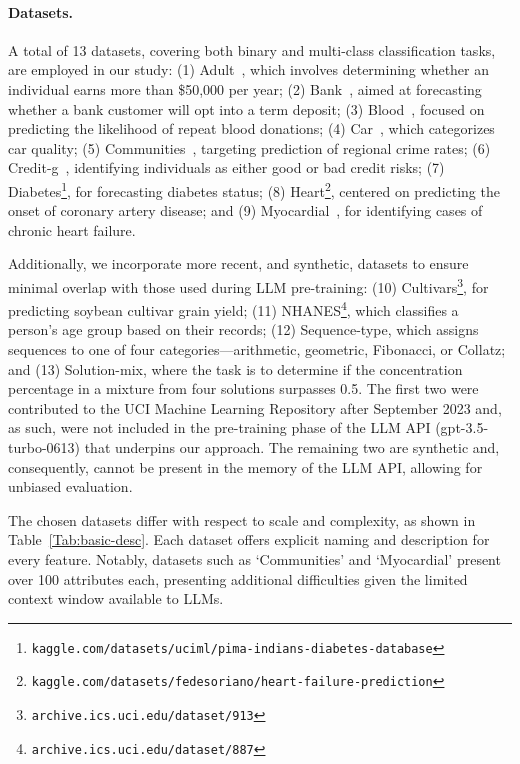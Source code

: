 \paragraph{Datasets.}
A total of 13 datasets, covering both binary and multi-class classification tasks, are employed in our study: (1) Adult~\cite{asuncion2007uci}, which involves determining whether an individual earns more than \$50,000 per year; (2) Bank~\cite{moro2014data}, aimed at forecasting whether a bank customer will opt into a term deposit; (3) Blood~\cite{yeh2009knowledge}, focused on predicting the likelihood of repeat blood donations; (4) Car~\cite{kadra2021well}, which categorizes car quality; (5) Communities~\cite{misc_communities_and_crime_183}, targeting prediction of regional crime rates; (6) Credit-g~\cite{kadra2021well}, identifying individuals as either good or bad credit risks; (7) Diabetes\footnote{\texttt{kaggle.com/datasets/uciml/pima-indians-diabetes-database}}, for forecasting diabetes status; (8) Heart\footnote{\texttt{kaggle.com/datasets/fedesoriano/heart-failure-prediction}}, centered on predicting the onset of coronary artery disease; and (9) Myocardial~\cite{misc_myocardial_infarction_complications_579}, for identifying cases of chronic heart failure.

Additionally, we incorporate more recent, and synthetic, datasets to ensure minimal overlap with those used during LLM pre-training: (10) Cultivars\footnote{\texttt{archive.ics.uci.edu/dataset/913}}, for predicting soybean cultivar grain yield; (11) NHANES\footnote{\texttt{archive.ics.uci.edu/dataset/887}}, which classifies a person’s age group based on their records; (12) Sequence-type, which assigns sequences to one of four categories—arithmetic, geometric, Fibonacci, or Collatz; and (13) Solution-mix, where the task is to determine if the concentration percentage in a mixture from four solutions surpasses 0.5. The first two were contributed to the UCI Machine Learning Repository after September 2023 and, as such, were not included in the pre-training phase of the LLM API (gpt-3.5-turbo-0613) that underpins our approach. The remaining two are synthetic and, consequently, cannot be present in the memory of the LLM API, allowing for unbiased evaluation.

The chosen datasets differ with respect to scale and complexity, as shown in Table~\ref{Tab:basic-desc}. Each dataset offers explicit naming and description for every feature. Notably, datasets such as ‘Communities’ and ‘Myocardial’ present over 100 attributes each, presenting additional difficulties given the limited context window available to LLMs.

